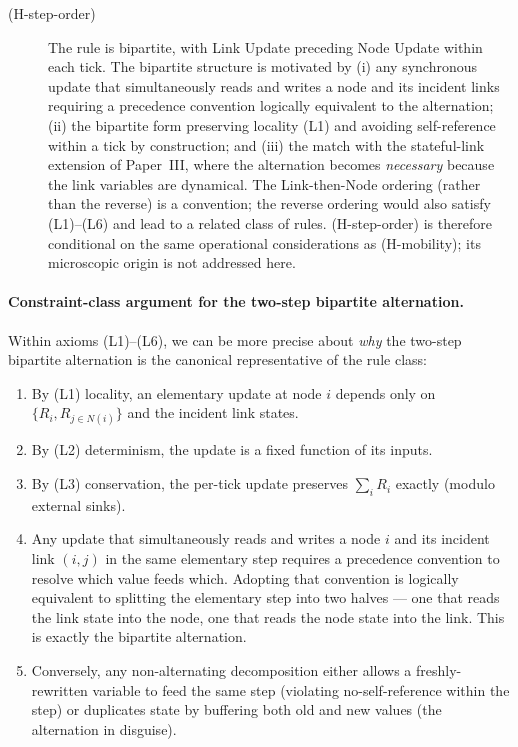 \documentclass[11pt,a4paper]{article}
\begin{document}
\begin{description}
\item[(H-step-order)] The rule is bipartite, with Link Update
preceding Node Update within each tick. The bipartite structure
is motivated by (i) any synchronous update that simultaneously
reads and writes a node and its incident links requiring a
precedence convention logically equivalent to the alternation;
(ii) the bipartite form preserving locality (L1) and avoiding
self-reference within a tick by construction; and (iii) the
match with the stateful-link extension of Paper~III, where the
alternation becomes \emph{necessary} because the link variables
are dynamical. The Link-then-Node ordering (rather than the
reverse) is a convention; the reverse ordering would also
satisfy (L1)--(L6) and lead to a related class of rules.
(H-step-order) is therefore conditional on the same operational
considerations as (H-mobility); its microscopic origin is not
addressed here.
\end{description}

\paragraph{Constraint-class argument for the two-step
bipartite alternation.}
Within axioms (L1)--(L6), we can be more precise about
\emph{why} the two-step bipartite alternation is the canonical
representative of the rule class:

\begin{enumerate}
\item By (L1) locality, an elementary update at node $i$ depends
only on $\{R_i, R_{j \in N(i)}\}$ and the incident link states.
\item By (L2) determinism, the update is a fixed function of
its inputs.
\item By (L3) conservation, the per-tick update preserves
$\sum_i R_i$ exactly (modulo external sinks).
\item Any update that simultaneously reads and writes a node
$i$ and its incident link $(i,j)$ in the same elementary step
requires a precedence convention to resolve which value feeds
which. Adopting that convention is logically equivalent to
splitting the elementary step into two halves --- one that
reads the link state into the node, one that reads the node
state into the link. This is exactly the bipartite
alternation.
\item Conversely, any non-alternating decomposition either
allows a freshly-rewritten variable to feed the same step
(violating no-self-reference within the step) or duplicates
state by buffering both old and new values (the alternation
in disguise).
\end{enumerate}
\end{document}
